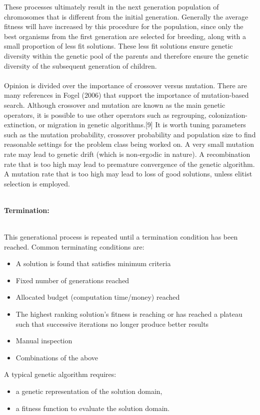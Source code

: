 \documentclass[a4paper, 12pt]{article}
\begin{document}
\noindent
These processes ultimately result in the next generation population of chromosomes that is different from the initial generation. Generally the average fitness will have increased by this procedure for the population, since only the best organisms from the first generation are selected for breeding, along with a small proportion of less fit solutions. These less fit solutions ensure genetic diversity within the genetic pool of the parents and therefore ensure the genetic diversity of the subsequent generation of children.\\~\\
\noindent
Opinion is divided over the importance of crossover versus mutation. There are many references in Fogel (2006) that support the importance of mutation-based search. Although crossover and mutation are known as the main genetic operators, it is possible to use other operators such as regrouping, colonization-extinction, or migration in genetic algorithms.[9] It is worth tuning parameters such as the mutation probability, crossover probability and population size to find reasonable settings for the problem class being worked on. A very small mutation rate may lead to genetic drift (which is non-ergodic in nature). A recombination rate that is too high may lead to premature convergence of the genetic algorithm. A mutation rate that is too high may lead to loss of good solutions, unless elitist selection is employed.\\~\\
\begin{large}\textbf{Termination:}\end{large}\\
This generational process is repeated until a termination condition has been reached. Common terminating conditions are:
\begin{itemize}
\item A solution is found that satisfies minimum criteria
\item Fixed number of generations reached
\item Allocated budget (computation time/money) reached
\item The highest ranking solution's fitness is reaching or has reached a plateau such that successive iterations no longer produce better results
\item Manual inspection
\item Combinations of the above
\end{itemize}
A typical genetic algorithm requires:
\begin{itemize}
\item a genetic representation of the solution domain,
\item a fitness function to evaluate the solution domain.
\end{itemize}
\end{document}
